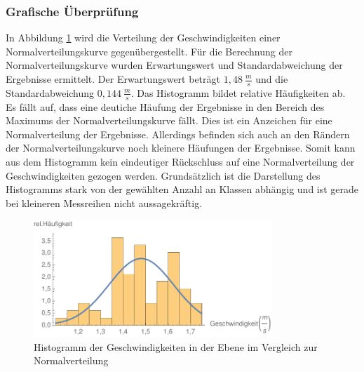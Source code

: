 \subsubsection{Grafische Überprüfung}
In Abbildung \ref{fig:histogramm_ebene} wird die Verteilung der Geschwindigkeiten einer Normalverteilungskurve gegenübergestellt. Für die Berechnung der Normalverteilungskurve wurden Erwartungswert und Standardabweichung der Ergebnisse ermittelt. Der Erwartungswert beträgt $1,48\ \frac{m}{s}$ und die Standardabweichung $0,144\ \frac{m}{s}$. Das Histogramm bildet relative Häufigkeiten ab. Es fällt auf, dass eine deutiche Häufung der Ergebnisse in den Bereich des Maximums der Normalverteilungskurve fällt. Dies ist ein Anzeichen für eine Normalverteilung der Ergebnisse. Allerdings befinden sich auch an den Rändern der Normalverteilungskurve noch kleinere Häufungen der Ergebnisse. Somit kann aus dem Histogramm kein eindeutiger Rückschluss auf eine Normalverteilung der Geschwindigkeiten gezogen werden. Grundsätzlich ist die Darstellung des Histogramms stark von der gewählten Anzahl an Klassen abhängig und ist gerade bei kleineren Messreihen nicht aussagekräftig.
\begin{figure}[htpb]
\centering
\includegraphics[width=0.8\textwidth]{abbildungen/Histogramm_2017_Ebene.pdf}
\caption{Histogramm der Geschwindigkeiten in der Ebene im Vergleich zur Normalverteilung}
\label{fig:histogramm_ebene}
\end{figure}


